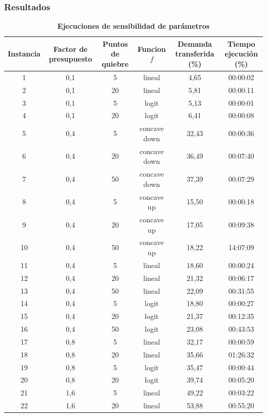 \documentclass{article}
\begin{document}
  \subsubsection*{Resultados}

  \begin{table}
    \centering
    \caption*{{\bf Ejecuciones de sensibilidad de parámetros}}
    \begin{tabular}{cccccc}
        \toprule
        Instancia & Factor de presupuesto & Puntos de quiebre & Funcion $f$ & Demanda transferida (\%) & Tiempo ejecución (\%) \\
        \midrule
        1 & 0,1 & 5 & lineal & 4,65 & 00:00:02 \\
        2 & 0,1 & 20 & lineal & 5,81 & 00:00:11 \\
        3 & 0,1 & 5 & logit & 5,13 & 00:00:01 \\
        4 & 0,1 & 20 & logit & 6,41 & 00:00:08 \\
        5 & 0,4 & 5 & concave down & 32,43 & 00:00:36 \\
        6 & 0,4 & 20 & concave down & 36,49 & 00:07:40 \\
        7 & 0,4 & 50 & concave down & 37,39 & 00:07:29 \\
        8 & 0,4 & 5 & concave up & 15,50 & 00:00:18 \\
        9 & 0,4 & 20 & concave up & 17,05 & 00:09:38 \\
        10 & 0,4 & 50 & concave up & 18,22 & 14:07:09 \\
        11 & 0,4 & 5 & lineal & 18,60 & 00:00:24 \\
        12 & 0,4 & 20 & lineal & 21,32 & 00:06:17 \\
        13 & 0,4 & 50 & lineal & 22,09 & 00:31:55 \\
        14 & 0,4 & 5 & logit & 18,80 & 00:00:27 \\
        15 & 0,4 & 20 & logit & 21,37 & 00:12:35 \\
        16 & 0,4 & 50 & logit & 23,08 & 00:43:53 \\
        17 & 0,8 & 5 & lineal & 32,17 & 00:00:59 \\
        18 & 0,8 & 20 & lineal & 35,66 & 01:26:32 \\
        19 & 0,8 & 5 & logit & 35,47 & 00:00:44 \\
        20 & 0,8 & 20 & logit & 39,74 & 00:05:20 \\
        21 & 1,6 & 5 & lineal & 49,22 & 00:03:22 \\
        22 & 1,6 & 20 & lineal & 53,88 & 00:55:20 \\

\end{tabular}
\end{table}
\end{document}
